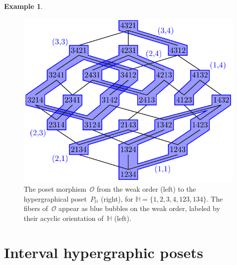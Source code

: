 \documentclass{amsart}
\theoremstyle{definition}
\newtheorem{example}[theorem]{Example}
\newcommand{\Or}{\mathcal O}  %
\newcommand{\HH}{\mathbb H}  %
\begin{document}
\begin{example}
\begin{figure}
	\centerline{
		\includegraphics[scale=.6]{weakOrderCongruence1}
		\qquad
	}
	\caption{The poset morphism~$\Or$ from the weak order (left) to the hypergraphical poset~$P_\HH$ (right), for $\HH=\{ 1, 2, 3, 4, 123, 134 \}$. The fibers of~$\Or$ appear as blue bubbles on the weak order, labeled by their acyclic orientation of~$\HH$ (left).}
	\label{fig:surjectionMap}
\end{figure}
\end{example}


\section{Interval hypergraphic posets}
\label{sec:IHP}
\end{document}
